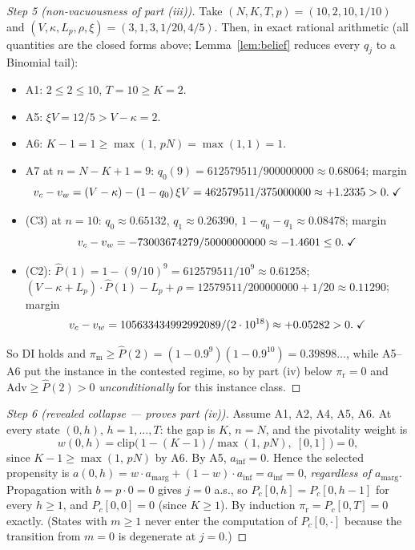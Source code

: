 \begin{proof}[Step 5 (non-vacuousness of part (iii))]
Take $(N,K,T,p) = (10, 2, 10, 1/10)$ and $(V, \kappa, L_p, \rho, \xi) = (3, 1, 3, 1/20, 4/5)$. Then, in exact rational arithmetic (all quantities are the closed forms above; Lemma~\ref{lem:belief} reduces every $q_j$ to a Binomial tail):
\begin{itemize}
\item A1: $2 \le 2 \le 10$, $T = 10 \ge K = 2$. \checkmark
\item A5: $\xi V = 12/5 > V - \kappa = 2$. \checkmark
\item A6: $K - 1 = 1 \ge \max(1,\, pN) = \max(1,1) = 1$. \checkmark
\item A7 at $n = N-K+1 = 9$: $q_0(9) = 612579511/900000000 \approx 0.68064$; margin
\[
v_c - v_w = (V-\kappa) - (1 - q_0)\,\xi V = 462579511/375000000 \approx +1.2335 > 0. \;\text{\checkmark}
\]
\item (C3) at $n = 10$: $q_0 \approx 0.65132$, $q_1 \approx 0.26390$, $1 - q_0 - q_1 \approx 0.08478$; margin
\[
v_c - v_w = -73003674279/50000000000 \approx -1.4601 \le 0. \;\text{\checkmark}
\]
\item (C2): $\widehat P(1) = 1 - (9/10)^9 = 612579511/10^9 \approx 0.61258$;
$(V-\kappa+L_p)\cdot \widehat P(1) - L_p + \rho = 12579511/200000000 + 1/20 \approx 0.11290$; margin
\[
v_c - v_w = 105633434992992089/(2 \cdot 10^{18}) \approx +0.05282 > 0. \;\text{\checkmark}
\]
\end{itemize}
So DI holds and $\pi_{\mathrm{m}} \ge \widehat P(2) = (1 - 0.9^9)(1 - 0.9^{10}) = 0.39898\ldots$, while A5--A6 put the instance in the contested regime, so by part (iv) below $\pi_{\mathrm{r}} = 0$ and $\mathrm{Adv} \ge \widehat P(2) > 0$ \emph{unconditionally} for this instance class.
\end{proof}

\begin{proof}[Step 6 (revealed collapse --- proves part (iv))]
Assume A1, A2, A4, A5, A6. At every state $(0,h)$, $h = 1, \dots, T$: the gap is $K$, $n = N$, and the pivotality weight is
\[
w(0,h) = \mathrm{clip}\bigl(\, 1 - (K-1)/\max(1,\, pN),\; [0,1] \,\bigr) = 0,
\]
since $K - 1 \ge \max(1,\, pN)$ by A6. By A5, $a_{\mathrm{inf}} = 0$. Hence the selected propensity is $a(0,h) = w \cdot a_{\mathrm{marg}} + (1-w) \cdot a_{\mathrm{inf}} = a_{\mathrm{inf}} = 0$, \emph{regardless of $a_{\mathrm{marg}}$}. Propagation with $b = p \cdot 0 = 0$ gives $j = 0$ a.s., so $P_c[0,h] = P_c[0,h-1]$ for every $h \ge 1$, and $P_c[0,0] = 0$ (since $K \ge 1$). By induction $\pi_{\mathrm{r}} = P_c[0,T] = 0$ exactly. (States with $m \ge 1$ never enter the computation of $P_c[0,\cdot]$ because the transition from $m = 0$ is degenerate at $j = 0$.)
\end{proof}

